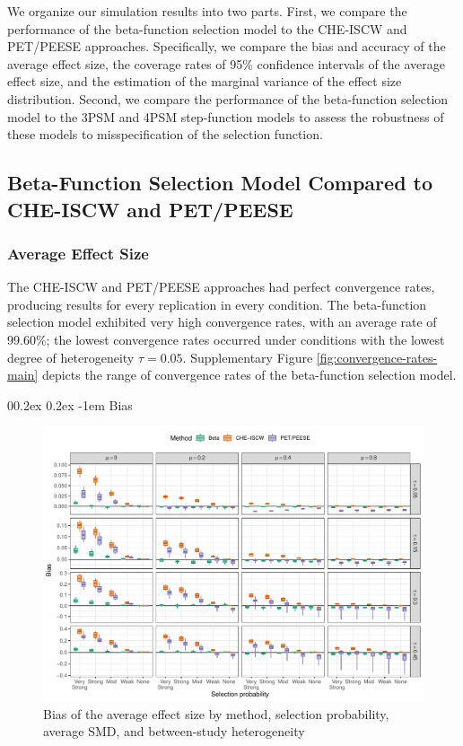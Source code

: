 \documentclass[
  american,
  man, donotrepeattitle,floatsintext]{apa7}
\makeatletter
\let\oldparagraph\paragraph
\renewcommand{\paragraph}{
    \@ifstar
      \xxxParagraphStar
      \xxxParagraphNoStar
  }
\newcommand{\xxxParagraphStar}[1]{\oldparagraph*{#1}\mbox{}}
\newcommand{\xxxParagraphNoStar}[1]{\oldparagraph{#1}\mbox{}}
\renewcommand{\paragraph}{\@startsection{paragraph}{4}{\parindent}%
  {0\baselineskip \@plus 0.2ex \@minus 0.2ex}%
  {-1em}%
  {\normalfont\normalsize\bfseries\itshape\typesectitle}}
\makeatother
\begin{document}
We organize our simulation results into two parts. First, we compare the performance of the beta-function selection model to the CHE-ISCW and PET/PEESE approaches. Specifically, we compare the bias and accuracy of the average effect size, the coverage rates of 95\% confidence intervals of the average effect size, and the estimation of the marginal variance of the effect size distribution. Second, we compare the performance of the beta-function selection model to the 3PSM and 4PSM step-function models to assess the robustness of these models to misspecification of the selection function.

\subsection{Beta-Function Selection Model Compared to CHE-ISCW and PET/PEESE}\label{beta-function-selection-model-compared-to-che-iscw-and-petpeese}

\subsubsection{Average Effect Size}\label{average-effect-size}

The CHE-ISCW and PET/PEESE approaches had perfect convergence rates, producing results for every replication in every condition. The beta-function selection model exhibited very high convergence rates, with an average rate of 99.60\%; the lowest convergence rates occurred under conditions with the lowest degree of heterogeneity \(\tau = 0.05\). Supplementary Figure \ref{fig:convergence-rates-main} depicts the range of convergence rates of the beta-function selection model.

\paragraph{Bias}\label{bias}

\begin{figure}
\includegraphics{beta-function-selection-models-with-dependent-effects_files/figure-latex/mu-bias-main-1} \caption{Bias of the average effect size by method, selection probability, average SMD, and between-study heterogeneity}\label{fig:mu-bias-main}
\end{figure}
\end{document}

